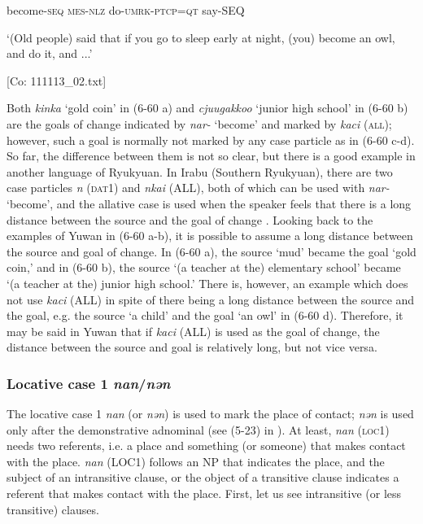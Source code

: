       become-\textsc{seq}  \textsc{mes}-\textsc{nlz}  do-\textsc{umrk}-\textsc{ptcp}=\textsc{qt}  say-SEQ

      ‘(Old people) said that if you go to sleep early at night, (you) become an owl, and do it, and ...’

      [Co: 111113\_02.txt]

Both \textit{kinka} ‘gold coin’ in (6-60 a) and \textit{cjuugakkoo} ‘junior high school’ in (6-60 b) are the goals of change indicated by \textit{nar-} ‘become’ and marked by \textit{kaci} (\textsc{all}); however, such a goal is normally not marked by any case particle as in (6-60 c-d). So far, the difference between them is not so clear, but there is a good example in another language of Ryukyuan. In Irabu (Southern Ryukyuan), there are two case particles \textit{n} (\textsc{dat}1) and \textit{nkai} (ALL), both of which can be used with \textit{nar-} ‘become’, and the allative case is used when the speaker feels that there is a long distance between the source and the goal of change \citep{Shimoji2013}. Looking back to the examples of Yuwan in (6-60 a-b), it is possible to assume a long distance between the source and goal of change. In (6-60 a), the source ‘mud’ became the goal ‘gold coin,’ and in (6-60 b), the source ‘(a teacher at the) elementary school’ became ‘(a teacher at the) junior high school.’ There is, however, an example which does not use \textit{kaci} (ALL) in spite of there being a long distance between the source and the goal, e.g. the source ‘a child’ and the goal ‘an owl’ in (6-60 d). Therefore, it may be said in Yuwan that if \textit{kaci} (ALL) is used as the goal of change, the distance between the source and goal is relatively long, but not vice versa.

\subsubsection{Locative case 1 \textit{nan}/\textit{nən}}

The locative case 1 \textit{nan} (or \textit{nən}) is used to mark the place of contact; \textit{nən} is used only after the demonstrative adnominal (see (5-23) in ). At least, \textit{nan} (\textsc{loc}1) needs two referents, i.e. a place and something (or someone) that makes contact with the place. \textit{nan} (LOC1) follows an NP that indicates the place, and the subject of an intransitive clause, or the object of a transitive clause indicates a referent that makes contact with the place. First, let us see intransitive (or less transitive) clauses.

